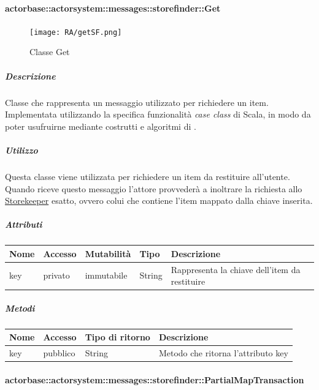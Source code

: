 \documentclass{scalatekids-article}
\begin{document}
\paragraph{actorbase::actorsystem::messages::storefinder::Get}
\label{sec:actorbase::actorsystem::messages::storefinder::Get}

\begin{figure}[H]
  \begin{center}
    \texttt{[image: RA/getSF.png]}
    \caption{Classe Get}
  \end{center}
\end{figure}

\subparagraph{Descrizione}
Classe che rappresenta un messaggio utilizzato per richiedere un item.\\Implementata utilizzando la specifica funzionalità \textit{case class} di Scala,
in modo da poter usufruirne mediante costrutti e algoritmi di
.

\subparagraph{Utilizzo}
Questa classe viene utilizzata per richiedere un item da restituire
all'utente.\\Quando riceve questo messaggio l'attore provvederà a inoltrare la
richiesta allo \hyperref[sec:actorbase::actorsystem::actors::storekeeper::Storekeeper]{Storekeeper} esatto, ovvero colui che contiene l'item mappato dalla chiave inserita.

\subparagraph{Attributi}
\begin{tabular}{| p{2cm} | p{1.5cm} | p{2cm} | p{3cm} | p{8.5cm} |}
  \hline
  Nome & Accesso & Mutabilità & Tipo & Descrizione\\
  \hline
  key & privato & immutabile & String & Rappresenta la chiave dell'item da restituire\\
  \hline
\end{tabular}

\subparagraph{Metodi}
\begin{tabular}{| l | l | l | l |}
  \hline
  Nome & Accesso & Tipo di ritorno & Descrizione\\
  \hline
  key & pubblico & String & Metodo che ritorna l'attributo key\\
  \hline
\end{tabular}

\paragraph{actorbase::actorsystem::messages::storefinder::PartialMapTransaction}
\label{sec:actorbase::actorsystem::messages::storefinder::PartialMapTransaction}
\end{document}
